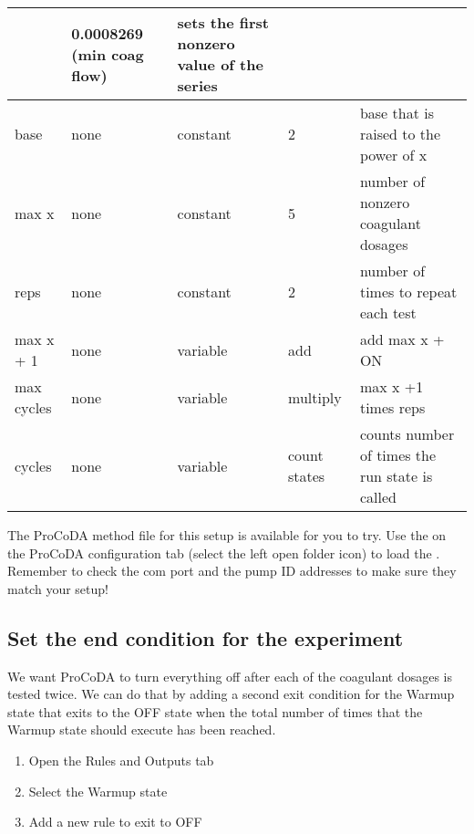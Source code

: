 \documentclass[letterpaper,10pt,english]{sphinxmanual}
\begin{document}
\begin{savenotes}
\begin{tabulary}{\linewidth}[t]{|T|T|T|T|T|}
&
0.0008269 (min coag flow)
&
sets the first nonzero value of the series
\\
\hline
base
&
none
&
constant
&
2
&
base that is raised to the power of x
\\
\hline
max x
&
none
&
constant
&
5
&
number of nonzero coagulant dosages
\\
\hline
reps
&
none
&
constant
&
2
&
number of times to repeat each test
\\
\hline
max x + 1
&
none
&
variable
&
add
&
add max x + ON
\\
\hline
max cycles
&
none
&
variable
&
multiply
&
max x +1 times reps
\\
\hline
cycles
&
none
&
variable
&
count states
&
counts number of times the run state is called
\\
\hline
\end{tabulary}
\par
\sphinxattableend\end{savenotes}

The ProCoDA method file for this setup is available for you to try. Use the  on the ProCoDA configuration tab (select the left open folder icon) to load the . Remember to check the com port and the pump ID addresses to make sure they match your setup!


\subsection{Set the end condition for the experiment}
\label{\detokenize{ProCoDA/ProCoDA:set-the-end-condition-for-the-experiment}}
We want ProCoDA to turn everything off after each of the coagulant dosages is tested twice. We can do that by adding a second exit condition for the Warmup state that exits to the OFF state when the total number of times that the Warmup state should execute has been reached.
\begin{enumerate}
\item {} 
Open the Rules and Outputs tab

\item {} 
Select the Warmup state

\item {} 
Add a new rule to exit to OFF 

\end{enumerate}
\end{document}
